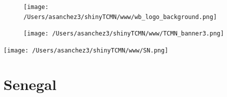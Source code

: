 \documentclass{article}\usepackage[]{graphicx}\usepackage[]{color}
\begin{document}
%

\begin{figure}
  \vspace{-3ex} %
  \hspace{-7ex} %
  \texttt{[image: /Users/asanchez3/shinyTCMN/www/wb\_logo\_background.png]}
\end{figure}
\begin{figure}
  \begin{minipage}[t]{0.99\textwidth} %
      \vspace{-30ex}
      \hspace{-2ex}
      \raggedright{\texttt{[image: /Users/asanchez3/shinyTCMN/www/TCMN\_banner3.png]}}
  \end{minipage}
\end{figure}
%
\begin{minipage}[t]{0.99\textwidth} %
  \vspace{-1.5cm}
  \begin{minipage}[c]{0.36\textwidth} 
    \begin{minipage}[c]{0.28\textwidth} %
      \texttt{[image: /Users/asanchez3/shinyTCMN/www/SN.png]}
    \end{minipage}
    \begin{minipage}[c]{0.70\textwidth} %
      \section*{\color{blue!40!black}Senegal}
    \end{minipage}
  \end{minipage}
  \begin{minipage}[c]{0.63\textwidth} %
    \centering
  \end{minipage}  
\end{minipage} %
\end{document}
